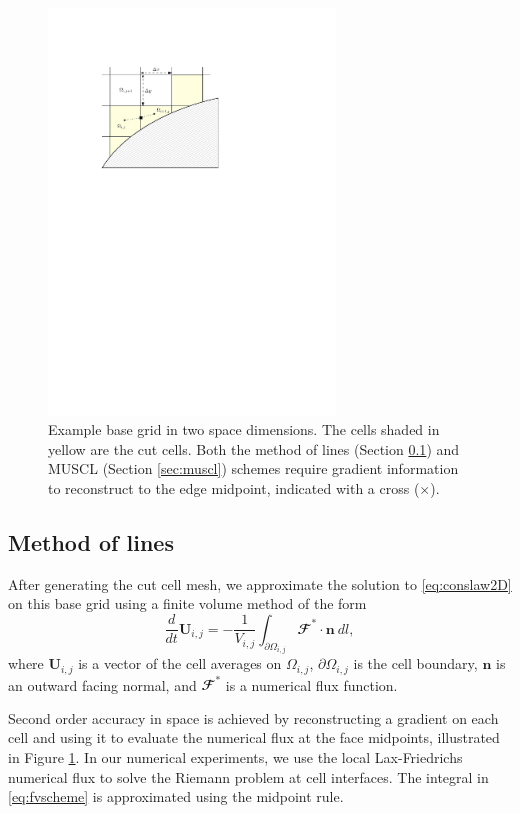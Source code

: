 \begin{figure}
\begin{center}
\includegraphics[width=3.0in]{figs/example_ccmesh.pdf}
\caption{\sf Example base grid in two space dimensions. The cells shaded in yellow are the cut cells.  Both the method of lines (Section \ref{sec:mol}) and MUSCL (Section \ref{sec:muscl}) schemes require gradient information to reconstruct to the edge midpoint, indicated with a cross ($\times$).} 
\label{fig:2dfig}
\end{center}
\end{figure}


\subsection{Method of lines} \label{sec:mol}

After generating the cut cell mesh, we approximate the solution to \eqref{eq:conslaw2D} on this base grid using a finite volume method of the form
\begin{equation}\label{eq:fvscheme}
\frac{d}{dt}\mathbf{U}_{i,j} =- \frac{1}{V_{i,j}} \int_{\partial \Omega_{i,j}} \mathbfcal{F} ^* \cdot \mathbf{n} ~dl,
\end{equation}
where $\mathbf{U}_{i,j}$ is a vector of the cell averages on $\Omega_{i,j}$, $\partial \Omega_{i,j}$ is the cell boundary, $\mathbf{n}$ is an outward facing normal, and $\mathbfcal{F}^*$ is a numerical flux function.

Second order accuracy in space is achieved by reconstructing a gradient on each
cell and using it to evaluate the numerical flux at the face midpoints,
illustrated in Figure \ref{fig:2dfig}.  
In our numerical experiments, we use the local Lax-Friedrichs numerical 
flux to solve the Riemann problem at cell interfaces. The integral in \eqref{eq:fvscheme} is  approximated using the midpoint rule.

